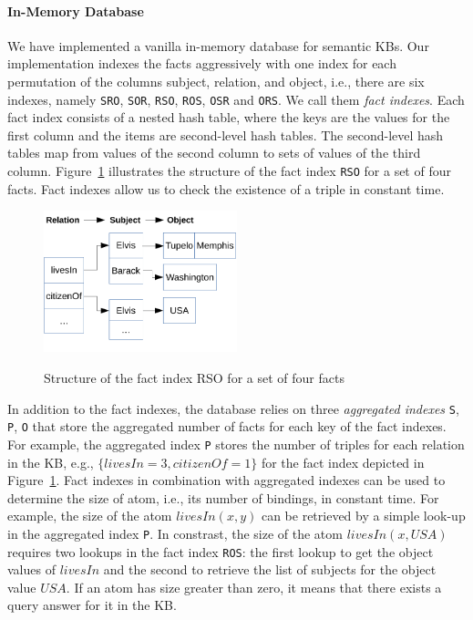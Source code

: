 \paragraph{In-Memory Database} We have implemented a vanilla in-memory database for semantic KBs.
Our implementation indexes the facts aggressively with one index for each permutation of 
the columns subject, relation, and object, i.e., there are six indexes, namely \texttt{SRO}, \texttt{SOR}, 
\texttt{RSO}, \texttt{ROS}, \texttt{OSR} and \texttt{ORS}. We call them \emph{fact indexes}.
Each fact index consists of a nested hash table, where the keys are the values for the first column and the items
are second-level hash tables. The second-level hash tables map from values of the second column
to sets of values of the third column. 
Figure~\ref{indexes} illustrates the structure of the fact index \texttt{RSO} for a set of four facts.
Fact indexes allow us to check the existence of a triple in constant time.

\begin{figure}
\includegraphics[width=0.5\textwidth]{figures/indexes}\
\caption{Structure of the fact index RSO for a set of four facts}
\label{indexes}
\end{figure}

In addition to the fact indexes, the database relies 
on three \emph{aggregated indexes} \texttt{S}, \texttt{P}, \texttt{O} that store the aggregated number of facts for each
key of the fact indexes. For example, the aggregated index \texttt{P} stores the number of triples for each relation
in the KB, e.g., $\{ livesIn=3, citizenOf=1 \}$ for the fact index depicted in Figure~\ref{indexes}. 
Fact indexes in combination with aggregated indexes can be used to determine the size of atom, i.e., its number of bindings, 
in constant time. For example, the size of the atom $livesIn(x,y)$ can be retrieved by a simple look-up 
in the aggregated index \texttt{P}. In constrast, the size of the atom $livesIn(x, USA)$ requires two 
lookups in the fact index \texttt{ROS}: the first lookup to get the object values of $livesIn$ and the second
to retrieve the list of subjects for the object value $USA$. If an atom has size greater than zero, it means
that there exists a query answer for it in the KB.

